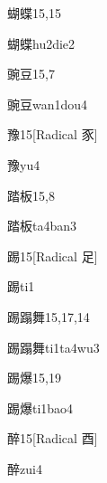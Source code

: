 \begin{entry}{蝴蝶}{15,15}
  \begin{phonetics}{蝴蝶}{hu2die2}
  \end{phonetics}
\end{entry}

\begin{entry}{豌豆}{15,7}
  \begin{phonetics}{豌豆}{wan1dou4}
  \end{phonetics}
\end{entry}

\begin{entry}{豫}{15}[Radical 豕]
  \begin{phonetics}{豫}{yu4}
  \end{phonetics}
\end{entry}

\begin{entry}{踏板}{15,8}
  \begin{phonetics}{踏板}{ta4ban3}
  \end{phonetics}
\end{entry}

\begin{entry}{踢}{15}[Radical 足]
  \begin{phonetics}{踢}{ti1}
  \end{phonetics}
\end{entry}

\begin{entry}{踢蹋舞}{15,17,14}
  \begin{phonetics}{踢蹋舞}{ti1ta4wu3}
  \end{phonetics}
\end{entry}

\begin{entry}{踢爆}{15,19}
  \begin{phonetics}{踢爆}{ti1bao4}
  \end{phonetics}
\end{entry}

\begin{entry}{醉}{15}[Radical 酉]
  \begin{phonetics}{醉}{zui4}
  \end{phonetics}
\end{entry}

